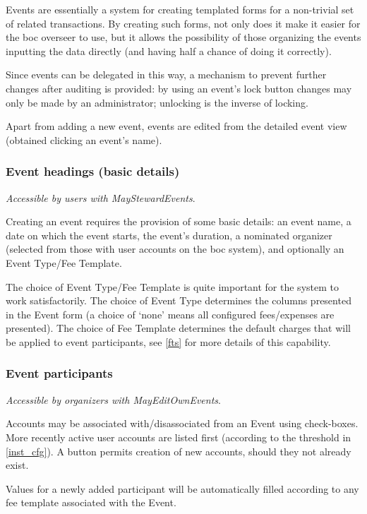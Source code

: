 \documentclass{report}
\begin{document}
Events are essentially a system for creating templated forms for a non-trivial set of related transactions.  By creating such forms, not only does it make it easier for the boc overseer to use, but it allows the possibility of those organizing the events inputting the data directly (and having half a chance of doing it correctly).

Since events can be delegated in this way, a mechanism to prevent further changes after auditing is provided: by using an event's lock button changes may only be made by an administrator; unlocking is the inverse of locking.

Apart from adding a new event, events are edited from the detailed event view (obtained clicking an event's name).

\subsubsection{Event headings (basic details)}

\emph{Accessible by users with MayStewardEvents}.

Creating an event requires the provision of some basic details: an event name, a date on which the event starts, the event's duration, a nominated organizer (selected from those with user accounts on the boc system), and optionally an Event Type/Fee Template.

The choice of Event Type/Fee Template is quite important for the system to work satisfactorily.  The choice of Event Type determines the columns presented in the Event form (a choice of `none' means all configured fees/expenses are presented).  The choice of Fee Template determines the default charges that will be applied to event participants, see \autoref{fts} for more details of this capability.

\subsubsection{Event participants}

\emph{Accessible by organizers with MayEditOwnEvents}.

Accounts may be associated with/disassociated from an Event using check-boxes.  More recently active user accounts are listed first (according to the threshold in \autoref{inst_cfg}).  A button permits creation of new accounts, should they not already exist.

Values for a newly added participant will be automatically filled according to any fee template associated with the Event.
\end{document}
